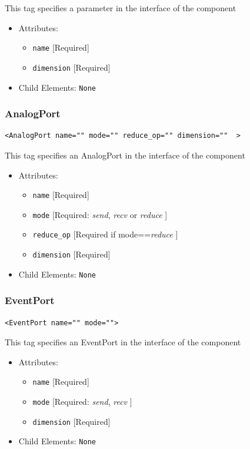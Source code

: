 \documentclass{article}
\begin{document}
This tag specifies a parameter in the interface of the component

\begin{itemize}
\item Attributes:
%
\begin{itemize}
\item \verb|name| {[}Required{]}
\item \verb|dimension| {[}Required{]}
\end{itemize}

\item Child Elements: \texttt{None}
\end{itemize}

\subsubsection{AnalogPort}
%
\begin{lstlisting}
<AnalogPort name="" mode="" reduce_op="" dimension=""  >
\end{lstlisting}

This tag specifies an AnalogPort in the interface of the component

\begin{itemize}
\item Attributes:
%
\begin{itemize}
\item \verb|name| {[}Required{]}
\item \verb|mode| {[}Required: \emph{send}, \emph{recv} or \emph{reduce} {]}
\item \verb|reduce_op| {[}Required if mode==\emph{reduce} {]}
\item \verb|dimension| {[}Required{]}
\end{itemize}

\item Child Elements: \texttt{None}
\end{itemize}

\subsubsection{EventPort}
%
\begin{lstlisting}
<EventPort name="" mode="">
\end{lstlisting}

This tag specifies an EventPort in the interface of the component

\begin{itemize}
\item Attributes:
%
\begin{itemize}
\item \verb|name| {[}Required{]}
\item \verb|mode| {[}Required: \emph{send}, \emph{recv} {]}
\item \verb|dimension| {[}Required{]}
\end{itemize}

\item Child Elements: \texttt{None}
\end{itemize}
\end{document}
